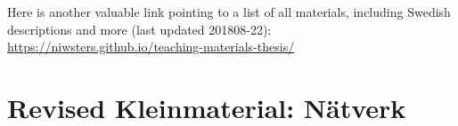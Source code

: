 Here is another valuable link pointing to a list of all materials, including Swedish descriptions and more  (last updated 201808-22):
\url{https://niwsters.github.io/teaching-materials-thesis/}


\newpage

\section{Revised Kleinmaterial: Nätverk}
\label{app:case1}

